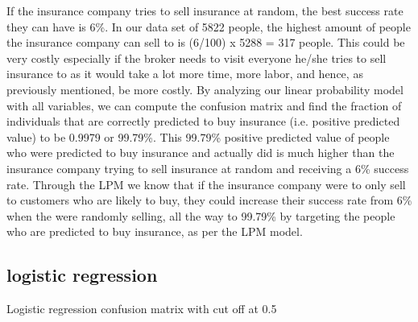 \documentclass{article}
\begin{document}
If the insurance company tries to sell insurance at random, the best success rate they can have is 6\%. In our data set of 5822 people, the highest amount of people the insurance company can sell to is (6/100) x 5288 = 317 people. This could be very costly especially if the broker needs to visit everyone he/she tries to sell insurance to as it would take a lot more time, more labor, and hence, as previously mentioned, be more costly. By analyzing our linear probability model with all variables, we can compute the confusion matrix and find the fraction of individuals that are correctly predicted to buy insurance (i.e. positive predicted value) to be 0.9979 or 99.79\%. This 99.79\% positive predicted value of people who were predicted to buy insurance and actually did is much higher than the insurance company trying to sell insurance at random and receiving a 6\% success rate. Through the LPM we know that if the insurance company were to only sell to customers who are likely to buy, they could increase their success rate from 6\% when the were randomly selling, all the way to 99.79\% by targeting the people who are predicted to buy insurance, as per the LPM model. 



\subsection{logistic regression}

\begin{table}[!htb]
\caption{Logistic regression confusion matrix with cut off at 0.5}
\label{model1}
\begin{center}


\end{center}
\end{table}
\end{document}
